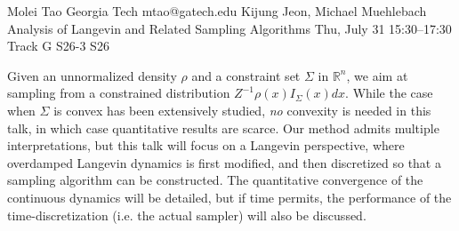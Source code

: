 \begin{talk}
  {Molei Tao}%
  {Georgia Tech}%
  {mtao@gatech.edu}%
  {Kijung Jeon, Michael Muehlebach}%
  {Analysis of Langevin and Related Sampling Algorithms}%
  {}%
  {Thu, July 31 15:30–17:30 Track G}%
  {S26-3}%
  {S26}%
				

Given an unnormalized density $\rho$ and a constraint set $\Sigma$ in $\mathbb{R}^n$, we aim at sampling from a constrained distribution $Z^{-1} \rho(x) I_{\Sigma}(x) dx$. While the case when $\Sigma$ is convex has been extensively studied, \emph{no} convexity is needed in this talk, in which case quantitative results are scarce. %
Our method admits multiple interpretations, but this talk will focus on a Langevin perspective, where overdamped Langevin dynamics is first modified, and then discretized so that a sampling algorithm can be constructed. The quantitative convergence of the continuous dynamics will be detailed, but if time permits, the performance of the time-discretization (i.e. the actual sampler) will also be discussed.





\end{talk}

